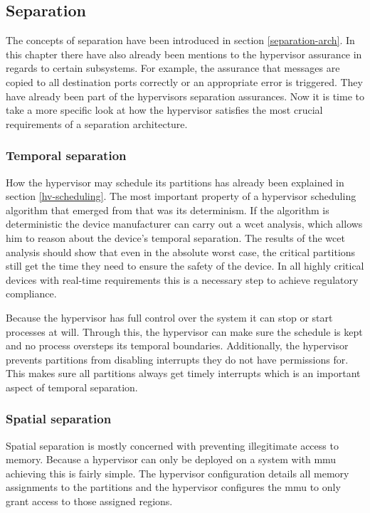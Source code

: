 \subsection{Separation}
The concepts of separation have been introduced in section \ref{separation-arch}. In this chapter there have also already been mentions to the hypervisor assurance in regards to certain subsystems. For example, the assurance that messages are copied to all destination ports correctly or an appropriate error is triggered. They have already been part of the hypervisors separation assurances. Now it is time to take a more specific look at how the hypervisor satisfies the most crucial requirements of a separation architecture. 

\subsubsection{Temporal separation}
How the hypervisor may schedule its partitions has already been explained in section \ref{hv-scheduling}. The most important property of a hypervisor scheduling algorithm that emerged from that was its determinism. If the algorithm is deterministic the device manufacturer can carry out a \acrshort{wcet} analysis, which allows him to reason about the device's temporal separation. The results of the \acrshort{wcet} analysis should show that even in the absolute worst case, the critical partitions still get the time they need to ensure the safety of the device. In all highly critical devices with real-time requirements this is a necessary step to achieve regulatory compliance.

Because the hypervisor has full control over the system it can stop or start processes at will. Through this, the hypervisor can make sure the schedule is kept and no process oversteps its temporal boundaries.
Additionally, the hypervisor prevents partitions from disabling interrupts they do not have permissions for. This makes sure all partitions always get timely interrupts which is an important aspect of temporal separation. 
\subsubsection{Spatial separation}
Spatial separation is mostly concerned with preventing illegitimate access to memory. Because a hypervisor can only be deployed on a system with \acrshort{mmu} achieving this is fairly simple. The hypervisor configuration details all memory assignments to the partitions and the hypervisor configures the \acrshort{mmu} to only grant access to those assigned regions. 


